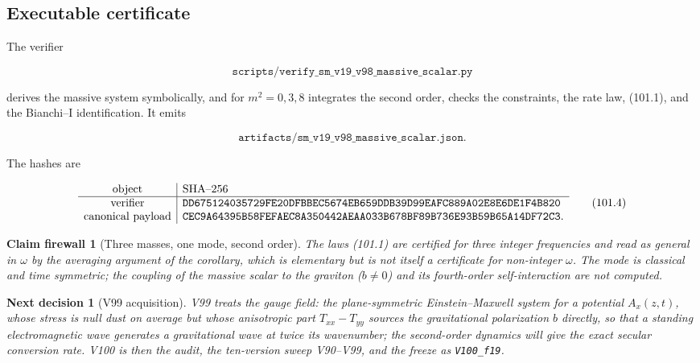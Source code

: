 \documentclass[11pt]{article}
\newtheorem{firewall}[theorem]{Claim firewall}
\newtheorem{decision}[theorem]{Next decision}
\theoremstyle{remark}
\begin{document}
\subsection{Executable certificate}

The verifier

\[
 \texttt{scripts/verify\_sm\_v19\_v98\_massive\_scalar.py}            \tag{101.2}
\]

derives the massive system symbolically, and for \(m^2=0,3,8\)
integrates the second order, checks the constraints, the rate law,
(101.1), and the Bianchi--I identification.  It emits

\[
 \texttt{artifacts/sm\_v19\_v98\_massive\_scalar.json}.               \tag{101.3}
\]

The hashes are

\[
\begin{array}{c|l}
\hbox{object}&\hbox{SHA--256}\\ \hline
\hbox{verifier}&
\texttt{DD675124035729FE20DFBBEC5674EB659DDB39D99EAFC889A02E8E6DE1F4B820}\\
\hbox{canonical payload}&
\texttt{CEC9A64395B58FEFAEC8A350442AEAA033B678BF89B736E93B59B65A14DF72C3}.
\end{array}                                                     \tag{101.4}
\]

\begin{firewall}[Three masses, one mode, second order]
\label{fire:v19v98}
The laws (101.1) are certified for three integer frequencies and
read as general in \(\omega\) by the averaging argument of the
corollary, which is elementary but is not itself a certificate for
non-integer \(\omega\).  The mode is classical and time symmetric;
the coupling of the massive scalar to the graviton (\(b\neq0\)) and
its fourth-order self-interaction are not computed.
\end{firewall}

\begin{decision}[V99 acquisition]
\label{dec:v19v98-next}
V99 treats the gauge field: the plane-symmetric Einstein--Maxwell
system for a potential \(A_x(z,t)\), whose stress is null dust on
average but whose anisotropic part \(T_{xx}-T_{yy}\) sources the
gravitational polarization \(b\) directly, so that a standing
electromagnetic wave generates a gravitational wave at twice its
wavenumber; the second-order dynamics will give the exact secular
conversion rate.  V100 is then the audit, the ten-version sweep
V90--V99, and the freeze as \texttt{V100\_f19}.
\end{decision}
\end{document}
